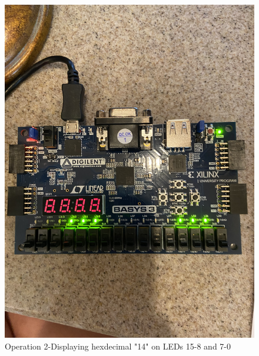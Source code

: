 \documentclass[11pt]{article}
\begin{document}
\begin{figure}[ht]\centering
	\includegraphics[angle=270, width=1.1\textwidth]{step2.jpg}
	\caption{Operation 2-Displaying hexdecimal "14" on LEDs 15-8 and 7-0}
	\label{fig:sim_with_table}
\end{figure}
\clearpage
\end{document}

